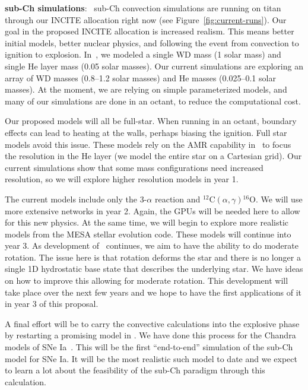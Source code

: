 {\bf sub-Ch simulations}: \maestro\ sub-Ch convection simulations are
running on titan through our INCITE allocation right now (see
Figure~\ref{fig:current-runs}).  Our goal in the proposed INCITE
allocation is increased realism.  This means better initial models,
better nuclear physics, and following the event from convection to
ignition to explosion.  In~\cite{Zin13}, we modeled a single WD mass
(1 solar mass) and single He layer mass (0.05 solar masses).  Our 
current simulations are exploring an array of WD masses (0.8--1.2 solar masses)
and He masses (0.025--0.1 solar masses).  At the moment, we are relying
on simple parameterized models, and many of our simulations are done in an
octant, to reduce the computational cost.

Our proposed models will all be full-star.  When running in an octant,
boundary effects can lead to heating at the walls, perhaps biasing the
ignition.  Full star models avoid this issue.  These models rely on the AMR
capability in \maestro\ to focus the resolution in the He layer (we
model the entire star on a Cartesian grid).  Our current simulations
show that some mass configurations need increased resolution, so we will
explore higher resolution models in year 1. 

The current models include only the 3-$\alpha$ reaction and
$^{12}\mathrm{C} (\alpha,\gamma){}^{16}\mathrm{O}$.  We will use more
extensive networks in year 2.  Again, the GPUs will be needed here to allow
for this new physics.  At the same time, we will begin to
explore more realistic models from the MESA stellar evolution code.
These models will continue into year 3.  As development of \maestro\
continues, we aim to have the ability to do moderate rotation.
The issue here is that rotation deforms the star and there is no
longer a single 1D hydrostatic base state that describes the underlying
star.  We have ideas on how to improve this allowing for moderate rotation.
This development will take place over the next few years and we hope to
have the first applications of it in year 3 of this proposal.

A final effort will be to carry the convective calculations into the
explosive phase by restarting a promising model in \castro.  We have
done this process for the Chandra models of SNe Ia~\cite{Mal14}.  This
will be the first ``end-to-end'' simulation of the sub-Ch model for
SNe Ia.  It will be the most realistic such model to date and we expect
to learn a lot about the feasibility of the sub-Ch paradigm through
this calculation.





